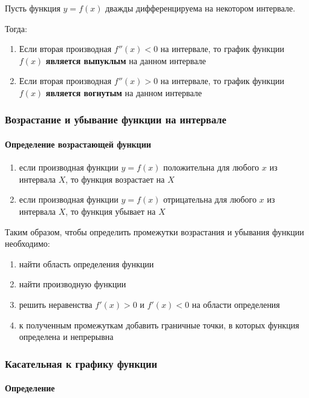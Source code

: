 \documentclass{article}
\begin{document}
Пусть функция $y = f(x)$ дважды дифференцируема на некотором интервале.

Тогда:

\begin{enumerate}
    \item Если вторая производная $f''(x) < 0$ на интервале, то график функции $f(x)$ \textbf{является выпуклым} на данном интервале
    \item Если вторая производная $f''(x) > 0$ на интервале, то график функции $f(x)$ \textbf{является вогнутым} на данном интервале
\end{enumerate}

\subsubsection{Возрастание и убывание функции на интервале}

\paragraph{Определение возрастающей функции}

\begin{enumerate}
    \item если производная функции $y=f(x)$ положительна для любого $x$ из интервала $X$, то функция возрастает на $X$
    \item если производная функции $y=f(x)$ отрицательна для любого $x$ из интервала $X$, то функция убывает на $X$
\end{enumerate}

Таким образом, чтобы определить промежутки возрастания и убывания функции необходимо:

\begin{enumerate}
    \item найти область определения функции
    \item найти производную функции
    \item решить неравенства $f'(x) > 0$ и $f'(x) < 0$ на области определения
    \item к полученным промежуткам добавить граничные точки, в которых функция определена и непрерывна
\end{enumerate}
    
\subsubsection{Касательная к графику функции}

\paragraph{Определение}
\end{document}
